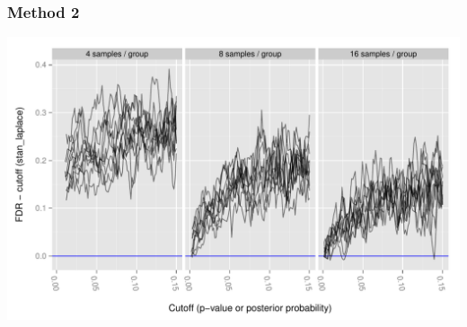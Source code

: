 \documentclass[handout]{beamer}
\numberwithin{equation}{section}
\begin{document}
\begin{frame}
\frametitle{Method 2}
\begin{center}
\includegraphics[scale=0.5]{fdr-method2stan}
\end{center}
\end{frame}
\end{document}
